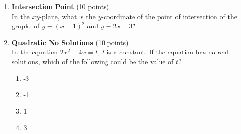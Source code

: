 \begin{enumerate}
  \item \textbf{Intersection Point} (10 points)\\
  In the $xy$-plane, what is the $y$-coordinate of the point of intersection of the graphs of $y=(x-1)^{2}$ and $y=2x-3$?
  \begin{subanswer}
  \end{subanswer}

  \item \textbf{Quadratic No Solutions} (10 points)\\
  In the equation $2x^{2}-4x=t$, $t$ is a constant. If the equation has no real solutions, which of the following could be the value of $t$?
  \begin{enumerate}[label=(\Alph*)]
    \item -3
    \item -1
    \item 1
    \item 3
  \end{enumerate}
  \begin{subanswer}
  \end{subanswer}
\end{enumerate}

